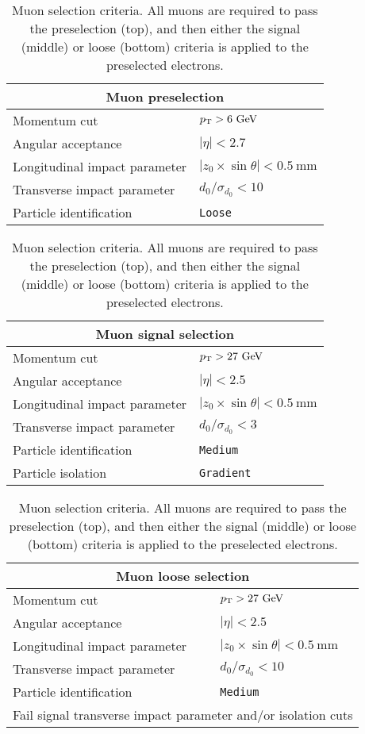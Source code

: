 \begin{table}[htbp]
  \centering
  \begin{tabular}{l l}
    \multicolumn{2}{c}{Muon preselection} \\ 
    \hline\hline
    Momentum cut                  & $p_{\mathrm{T}} > 6~\textrm{GeV}$ \\
    Angular acceptance            & $|\eta| < 2.7$ \\
    Longitudinal impact parameter & $|z_0\times\sin\theta| < 0.5~\textrm{mm}$ \\
    Transverse impact parameter   & $d_0/\sigma_{d_{0}} < 10$ \\
    Particle identification       & \tt{Loose} \\
    \hline
  \end{tabular}

  \vspace{8mm}

  \begin{tabular}{l l}
    \multicolumn{2}{c}{Muon signal selection} \\ 
    \hline\hline
    Momentum cut                  & $p_{\mathrm{T}} > 27~\textrm{GeV}$ \\
    Angular acceptance            & $|\eta| < 2.5$ \\
    Longitudinal impact parameter & $|z_0\times\sin\theta| < 0.5~\textrm{mm}$ \\
    Transverse impact parameter   & $d_0/\sigma_{d_{0}} < 3$ \\
    Particle identification       & \tt{Medium} \\
    Particle isolation            & \tt{Gradient}\\
    \hline
  \end{tabular}

  \vspace{8mm}

  \begin{tabular}{l l}
    \multicolumn{2}{c}{Muon loose selection} \\ 
    \hline\hline
    Momentum cut                  & $p_{\mathrm{T}} > 27~\textrm{GeV}$ \\
    Angular acceptance            & $|\eta| < 2.5$ \\
    Longitudinal impact parameter & $|z_0\times\sin\theta| < 0.5~\textrm{mm}$ \\
    Transverse impact parameter   & $d_0/\sigma_{d_{0}} < 10$ \\
    Particle identification       & \tt{Medium} \\
    \multicolumn{2}{c}{Fail signal transverse impact parameter and/or isolation cuts} \\
    \hline
  \end{tabular}
  \caption{Muon selection criteria.  All muons are required to pass the preselection (top), and then either the signal (middle) or loose (bottom) criteria is applied to the preselected electrons.}
  \label{tab:ssww13tev_muon_selection}
\end{table}
